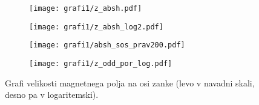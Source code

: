 \documentclass[12pt, a4paper]{article}
\begin{document}
\begin{figure}[h]
  \begin{subfigure}[b]{0.49\textwidth}
    \centering
    \texttt{[image: grafi1/z\_absh.pdf]}
    \caption{}
    \label{graf}
  \end{subfigure}
  \begin{subfigure}[b]{0.49\textwidth}
    \centering
    \texttt{[image: grafi1/z\_absh\_log2.pdf]}
    \caption{}
    \label{graf}
  \end{subfigure}
  \begin{subfigure}[b]{0.49\textwidth}
    \centering
    \texttt{[image: grafi1/absh\_sos\_prav200.pdf]}
    \caption{}
    \label{graf}
  \end{subfigure}
  \begin{subfigure}[b]{0.49\textwidth}
    \centering
    \texttt{[image: grafi1/z\_odd\_por\_log.pdf]}
    \caption{}
    \label{graf}
  \end{subfigure}
  \caption{Grafi velikosti magnetnega polja na osi zanke (levo v navadni skali, desno pa v logaritemski).}
\end{figure}


\FloatBarrier

\begin{comment}
\begin{figure}[h]
  \begin{subfigure}[b]{0.49\textwidth}
    \centering
    \texttt{[image: grafi1/z\_odd.pdf]}
    \label{graf}
  \end{subfigure}
  \begin{subfigure}[b]{0.49\textwidth}
    \centering
    \texttt{[image: grafi1/z\_odd\_log.pdf]}
    \label{graf}
  \end{subfigure}
  \begin{subfigure}[b]{0.49\textwidth}
    \centering
    \texttt{[image: grafi1/z\_odd\_por.pdf]}
    \label{graf}
  \end{subfigure}
  \begin{subfigure}[b]{0.49\textwidth}
    \centering
    \texttt{[image: grafi1/z\_odd\_por\_log.pdf]}
    \label{graf}
  \end{subfigure}
\end{figure}
\end{comment}
\end{document}
